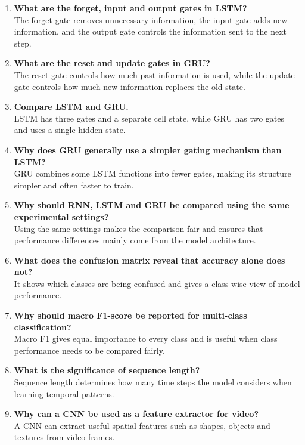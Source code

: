 \documentclass[10pt]{article}
\begin{document}
\begin{enumerate}
\item \textbf{What are the forget, input and output gates in LSTM?}\\
The forget gate removes unnecessary information, the input gate adds new information, and the output gate controls the information sent to the next step.

\item \textbf{What are the reset and update gates in GRU?}\\
The reset gate controls how much past information is used, while the update gate controls how much new information replaces the old state.

\item \textbf{Compare LSTM and GRU.}\\
LSTM has three gates and a separate cell state, while GRU has two gates and uses a single hidden state.

\item \textbf{Why does GRU generally use a simpler gating mechanism than LSTM?}\\
GRU combines some LSTM functions into fewer gates, making its structure simpler and often faster to train.

\item \textbf{Why should RNN, LSTM and GRU be compared using the same experimental settings?}\\
Using the same settings makes the comparison fair and ensures that performance differences mainly come from the model architecture.

\item \textbf{What does the confusion matrix reveal that accuracy alone does not?}\\
It shows which classes are being confused and gives a class-wise view of model performance.

\item \textbf{Why should macro F1-score be reported for multi-class classification?}\\
Macro F1 gives equal importance to every class and is useful when class performance needs to be compared fairly.

\item \textbf{What is the significance of sequence length?}\\
Sequence length determines how many time steps the model considers when learning temporal patterns.

\item \textbf{Why can a CNN be used as a feature extractor for video?}\\
A CNN can extract useful spatial features such as shapes, objects and textures from video frames.


\end{enumerate}
\end{document}
